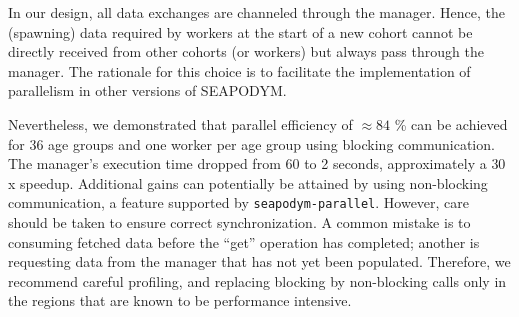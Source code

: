 \documentclass[a4paper,oneside,12pt]{article}
\begin{document}
In our design, all data exchanges are channeled through the manager. 
Hence, the (spawning) data required by workers at the start of a new cohort cannot be directly received from other 
cohorts (or workers) but always pass through the manager. The rationale for this choice is to facilitate the implementation of parallelism
in other versions of SEAPODYM.

Nevertheless, we demonstrated that parallel efficiency of $\approx 84$ \% can be achieved for 36 age groups and one worker per age group using blocking communication. 
The manager's execution time dropped from 60 to 2 seconds, approximately a $30$x speedup. Additional gains can potentially
be attained by using non-blocking communication, a feature supported by \verb|seapodym-parallel|. However, care should be taken to ensure 
correct synchronization. A common mistake is to consuming fetched data before the ``get'' operation has completed; another
is requesting data from the manager that has not yet been populated. Therefore, we recommend careful profiling, and replacing blocking by
non-blocking calls only in the regions that are known to be performance intensive. 
\end{document}
